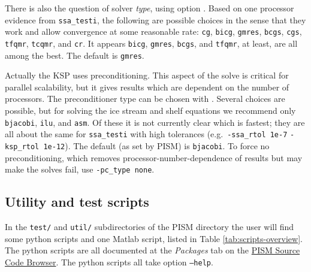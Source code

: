 There is also the question of solver \emph{type}, using option .  Based on one processor evidence from \texttt{ssa_testi}, the following are possible choices in the sense that they work and allow convergence at some reasonable rate: \texttt{cg}, \texttt{bicg}, \texttt{gmres}, \texttt{bcgs}, \texttt{cgs}, \texttt{tfqmr}, \texttt{tcqmr}, and \texttt{cr}.  It appears \texttt{bicg}, \texttt{gmres}, \texttt{bcgs}, and \texttt{tfqmr}, at least, are all among the best.  The default is \texttt{gmres}.

Actually the KSP uses preconditioning.  This aspect of the solve is critical for parallel scalability, but it gives results which are dependent on the number of processors.  The preconditioner type can be chosen with . Several choices are possible, but for solving the ice stream and shelf equations we recommend only \texttt{bjacobi}, \texttt{ilu}, and \texttt{asm}.  Of these it is not currently clear which is fastest; they are all about the same for \texttt{ssa_testi} with high tolerances (e.g.~\texttt{-ssa_rtol 1e-7} \texttt{-ksp_rtol 1e-12}).  The default (as set by PISM) is \texttt{bjacobi}.  To force no preconditioning, which removes processor-number-dependence of results but may make the solves fail, use \texttt{-pc_type none}.


\subsection{Utility and test scripts} \label{subsect:scripts} In the \verb|test/| and \verb|util/| subdirectories of the PISM directory the user will find some python scripts and one Matlab script, listed in Table \ref{tab:scripts-overview}.  The python scripts are all documented at the \textsl{Packages} tab on the \href{http://www.pism-docs.org/doxy/html/index.html}{PISM Source Code Browser}.  The python scripts all take option \texttt{--help}.

\newcommand{\scripthead}[1]{\texttt{#1}}

